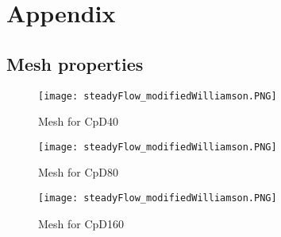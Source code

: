\appendix
\chapter{Appendix}
\section{Mesh properties}
	\begin{figure}[htp]
		\centering
		\texttt{[image: steadyFlow\_modifiedWilliamson.PNG]}
		\caption{Mesh for CpD40}
		\label{fig:ms40}
	\end{figure}
	\begin{figure}[htp]
		\centering
		\texttt{[image: steadyFlow\_modifiedWilliamson.PNG]}
		\caption{Mesh for CpD80}
		\label{fig:ms80}
	\end{figure} 
	\begin{figure}[htp]
		\centering
		\texttt{[image: steadyFlow\_modifiedWilliamson.PNG]}
		\caption{Mesh for CpD160}
		\label{fig:ms160}
	\end{figure}  
